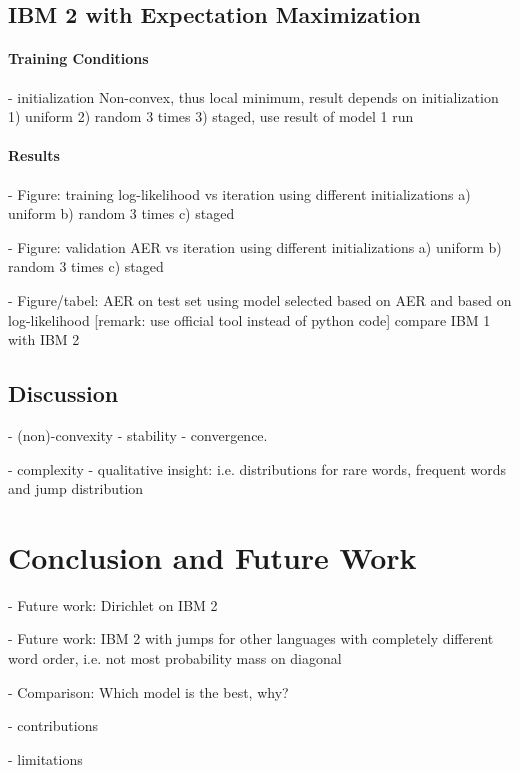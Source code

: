 \documentclass[11pt,a4paper]{article}
\begin{document}
\subsection{IBM 2 with Expectation Maximization}
\label{IBM2}

\paragraph{Training Conditions}

- initialization
Non-convex, thus local minimum, result depends on initialization
1) uniform 
2) random 3 times 
3) staged, use result of model 1 run


\paragraph{Results}

- Figure: training log-likelihood vs iteration
using different initializations
a) uniform 
b) random 3 times 
c) staged 

- Figure: validation AER vs iteration
using different initializations
a) uniform 
b) random 3 times 
c) staged 

- Figure/tabel: AER on test set using model selected based on AER and based on log-likelihood [remark: use official tool instead of python code]  
compare IBM 1 with IBM 2

\subsection{Discussion}

- (non)-convexity 
- stability 
- convergence.

- complexity
- qualitative insight: 
i.e. distributions for rare words, frequent words and jump distribution


\section{Conclusion and Future Work}

- Future work: Dirichlet on IBM 2

- Future work: IBM 2 with jumps for other languages with completely different word order,
i.e. not most probability mass on diagonal

- Comparison: Which model is the best, why?

- contributions 

- limitations
\end{document}
